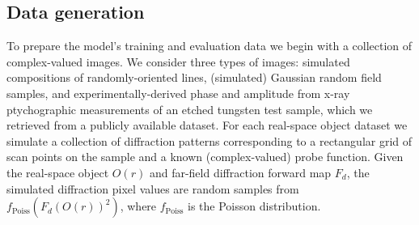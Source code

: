 \documentclass[sn-mathphys]{sn-jnl}%
\theoremstyle{thmstyleone}%
\theoremstyle{thmstyletwo}%
\theoremstyle{thmstylethree}%
\begin{document}
\subsection{Data generation}
To prepare the model's training and evaluation data we begin with a collection of complex-valued images. We consider three types of images: simulated compositions of randomly-oriented lines, (simulated) Gaussian random field samples, and experimentally-derived phase and amplitude from x-ray ptychographic measurements of an etched tungsten test sample, which we retrieved from a publicly available dataset. For each real-space object dataset we simulate a collection of diffraction patterns corresponding to a rectangular grid of scan points on the sample and a known (complex-valued) probe function. Given the real-space object $O(r)$ and far-field diffraction forward map $F_d$, the simulated diffraction pixel values are random samples from $f_{\text{Poiss}}(F_d(O(r))^2)$, where $f_{\text{Poiss}}$ is the Poisson distribution.



%
\end{document}
